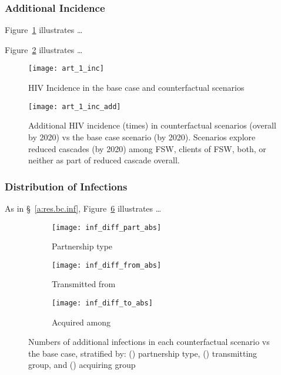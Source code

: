 \subsubsection{Additional Incidence}
Figure~\ref{fig:obj.1.inc} illustrates \dots
\par
Figure~\ref{fig:obj.1.inc.add} illustrates \dots
\par
\begin{figure}[h]
 \centerline{\texttt{[image: art\_1\_inc]}}
 \caption{HIV Incidence in the base case and counterfactual scenarios}
 \label{fig:obj.1.inc}
\end{figure}
\begin{figure}[h]
  \centering
  \texttt{[image: art\_1\_inc\_add]}
  \caption{Additional HIV incidence (times) in counterfactual scenarios (\casmid overall by 2020)
    vs the base case scenario (\cashigh by 2020).
    Scenarios explore reduced cascades (\caslow by 2020) among FSW, clients of FSW, both, or neither
    as part of reduced cascade overall.}
  \label{fig:obj.1.inc.add}
\end{figure}
\subsubsection{Distribution of Infections}\label{a:res.1.inf}
As in \S~\ref{a:res.bc.inf}, Figure~\ref{fig:inf.diff} illustrates \dots
\clearpage{}
\begin{figure}[h]
  \begin{subfigure}{\linewidth}
    \centerline{\texttt{[image: inf\_diff\_part\_abs]}}
    \caption{Partnership type}
    \label{fig:inf.diff.part}
  \end{subfigure}
  \begin{subfigure}{\linewidth}
    \centerline{\texttt{[image: inf\_diff\_from\_abs]}}
    \caption{Transmitted from}
    \label{fig:inf.diff.from}
  \end{subfigure}
  \begin{subfigure}{\linewidth}
    \centerline{\texttt{[image: inf\_diff\_to\_abs]}}
    \caption{Acquired among}
    \label{fig:inf.diff.to}
  \end{subfigure}
  \caption{Numbers of additional infections in each counterfactual scenario vs the base case, stratified by:
    () partnership type,
    () transmitting group, and
    () acquiring group}
  \label{fig:inf.diff}
\end{figure}
\clearpage\restoregeometry
